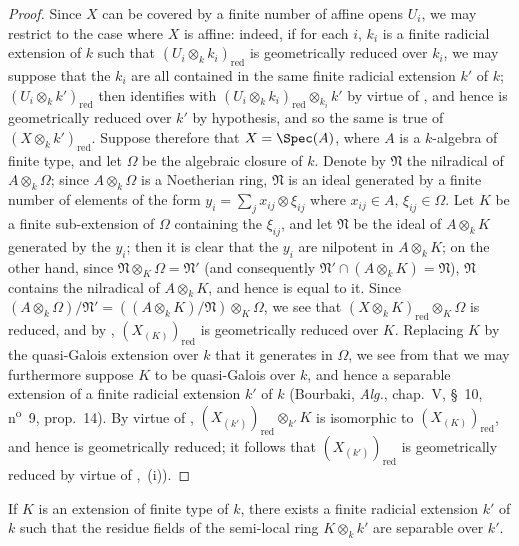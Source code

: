 \begin{proof}
Since $X$ can be covered by a finite number of affine opens $U_i$, we may restrict to the case where $X$ is affine: indeed, if for each $i$, $k_i$ is a finite radicial extension of $k$ such that $(U_i\otimes_k k_i)_{\mathrm{red}}$ is geometrically reduced over $k_i$, we may suppose that the $k_i$ are all contained in the same finite radicial extension $k'$ of $k$; $(U_i\otimes_k k')_{\mathrm{red}}$ then identifies with $(U_i\otimes_k k_i)_{\mathrm{red}}\otimes_{k_i} k'$ by virtue of , and hence is geometrically reduced over $k'$ by hypothesis, and so the same is true of $(X\otimes_k k')_{\mathrm{red}}$.
Suppose therefore that $X=\Spec(A)$, where $A$ is a $k$-algebra of finite type, and let $\Omega$ be the algebraic closure of $k$.
Denote by $\mathfrak{N}$ the nilradical of $A\otimes_k\Omega$; since $A\otimes_k\Omega$ is a Noetherian ring, $\mathfrak{N}$ is an ideal generated by a finite number of elements of the form $y_i = \sum_j x_{ij}\otimes\xi_{ij}$ where $x_{ij}\in A$, $\xi_{ij}\in\Omega$.
Let $K$ be a finite sub-extension of $\Omega$ containing the $\xi_{ij}$, and let $\mathfrak{N}$ be the ideal of $A\otimes_k K$ generated by the $y_i$; then it is clear that the $y_i$ are nilpotent in $A\otimes_k K$; on the other hand, since $\mathfrak{N}\otimes_K\Omega = \mathfrak{N}'$ (and consequently $\mathfrak{N}'\cap(A\otimes_k K) = \mathfrak{N}$), $\mathfrak{N}$ contains the nilradical of $A\otimes_k K$, and hence is equal to it.
Since $(A\otimes_k\Omega)/\mathfrak{N}' = ((A\otimes_k K)/\mathfrak{N})\otimes_K\Omega$, we see that $(X\otimes_k K)_{\mathrm{red}}\otimes_K\Omega$ is reduced, and by , $(X_{(K)})_{\mathrm{red}}$ is geometrically reduced over $K$.
Replacing $K$ by the quasi-Galois extension over $k$ that it generates in $\Omega$, we see from  that we may furthermore suppose $K$ to be quasi-Galois over $k$, and hence a separable extension of a finite radicial extension $k'$ of $k$ (Bourbaki, \emph{Alg.}, chap.~V, \S~10, n\textsuperscript{o}~9, prop.~14).
By virtue of , $(X_{(k')})_{\mathrm{red}}\otimes_{k'} K$ is isomorphic to $(X_{(K)})_{\mathrm{red}}$, and hence is geometrically reduced; it follows that $(X_{(k')})_{\mathrm{red}}$ is geometrically reduced by virtue of ,~(i)).
\end{proof}

\begin{corollary}[4.6.7]
\label{IV.4.6.7}
If $K$ is an extension of finite type of $k$, there exists a finite radicial extension $k'$ of $k$ such that the residue fields of the semi-local ring $K\otimes_k k'$ are separable over $k'$.
\end{corollary}

